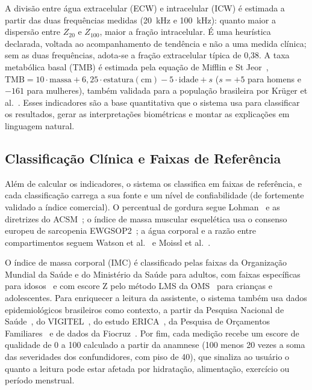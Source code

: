 
A divisão entre água extracelular (ECW) e intracelular (ICW) é estimada a partir das duas
frequências medidas (20~kHz e 100~kHz): quanto maior a dispersão entre $Z_{20}$ e $Z_{100}$,
maior a fração intracelular. É uma heurística declarada, voltada ao acompanhamento de
tendência e não a uma medida clínica; sem as duas frequências, adota-se a fração
extracelular típica de 0,38. A taxa metabólica basal (TMB) é estimada pela equação de
Mifflin e St Jeor~\cite{mifflin1990},
$\mathrm{TMB} = 10 \cdot \mathrm{massa} + 6{,}25 \cdot \mathrm{estatura(cm)} - 5 \cdot
\mathrm{idade} + s$ ($s = +5$ para homens e $-161$ para mulheres), também validada para a
população brasileira por Krüger et al.~\cite{kruger2015}. Esses indicadores são a base
quantitativa que o sistema usa para classificar os resultados, gerar as interpretações
biométricas e montar as explicações em linguagem natural.

\subsection{Classificação Clínica e Faixas de Referência}

Além de calcular os indicadores, o sistema os classifica em faixas de referência, e cada
classificação carrega a sua fonte e um nível de confiabilidade (de fortemente validado a
índice comercial). O percentual de gordura segue Lohman~\cite{lohman1992} e as diretrizes do
ACSM~\cite{acsm2021}; o índice de massa muscular esquelética usa o consenso europeu de
sarcopenia EWGSOP2~\cite{cruzjentoft2019}; a água corporal e a razão entre compartimentos
seguem Watson et al.~\cite{watson1980} e Moissl et al.~\cite{moissl2006}.

O índice de massa corporal (IMC) é classificado pelas faixas da Organização Mundial da Saúde
e do Ministério da Saúde para adultos, com faixas específicas para idosos~\cite{lipschitz1994}
e com escore Z pelo método LMS da OMS~\cite{who2007} para crianças e adolescentes. Para
enriquecer a leitura da assistente, o sistema também usa dados epidemiológicos brasileiros
como contexto, a partir da Pesquisa Nacional de Saúde~\cite{ibgepns2019}, do
VIGITEL~\cite{vigitel2023}, do estudo ERICA~\cite{bloch2016}, da Pesquisa de Orçamentos
Familiares~\cite{ibgepof2010} e de dados da Fiocruz~\cite{fiocruz2024}. Por fim, cada medição recebe um escore de qualidade de 0 a
100 calculado a partir da anamnese (100 menos 20 vezes a soma das severidades dos
confundidores, com piso de 40), que sinaliza ao usuário o quanto a leitura pode estar
afetada por hidratação, alimentação, exercício ou período menstrual.

